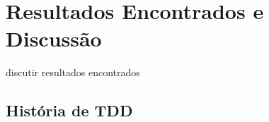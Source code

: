 \chapter{Resultados Encontrados e Discussão}
\label{cap:discussao}

discutir resultados encontrados

\section{História de TDD}